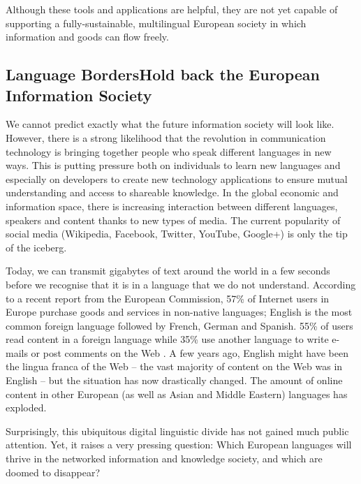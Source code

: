 \begin{multicols}{2}
Although these tools and applications are helpful, they are not yet capable of supporting a fully-sustainable, multilingual European society in which information and goods can flow freely.

\subsection[Language Borders Hold back the European Information Society]{Language Borders\newline Hold back the European Information Society}

We cannot predict exactly what the future information society will look like. However, there is a strong likelihood that the revolution in communication technology is bringing together people who speak different languages in new ways. This is putting pressure both on individuals to learn new languages and especially on developers to create new technology applications to ensure mutual understanding and access to shareable knowledge. In the global economic and information space, there is increasing interaction between different languages, speakers and content thanks to new types of media. The current popularity of social media (Wikipedia, Facebook, Twitter, YouTube, Google+) is only the tip of the iceberg.


Today, we can transmit gigabytes of text around the world in a few seconds before we recognise that it is in a language that we do not understand. According to a recent report from the European Commission, 57\% of Internet users in Europe purchase goods and services in non-native languages; English is the most common foreign language followed by French, German and Spanish. 55\% of users read content in a foreign language while 35\% use another language to write e-mails or post comments on the Web \cite{EC1}. A few years ago, English might have been the lingua franca of the Web -- the vast majority of content on the Web was in English -- but the situation has now drastically changed. The amount of online content in other European (as well as Asian and Middle Eastern) languages has exploded.

Surprisingly, this ubiquitous digital linguistic divide has not gained much public attention. Yet, it raises a very pressing question: Which European languages will thrive in the networked information and knowledge society, and which are doomed to disappear?


\end{multicols}
